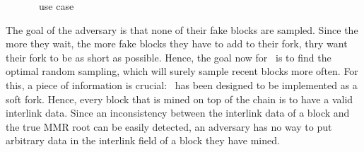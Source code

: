 \documentclass[11pt]{report}
\begin{document}
                    \begin{figure}[ht]
                    \centering
                    \caption{\FC\ use case}
                    \label{figure:fcusecase}
                \end{figure}
                
                    The goal of the adversary is that none of their fake blocks are sampled. Since the more they wait, the more fake blocks they have to add to their fork, thry want their fork to be as short as possible. Hence, the goal now for \FC\ is to find the optimal random sampling, which will surely sample recent blocks more often. For this, a piece of information is crucial: \FC\ has been designed to be implemented as a soft fork. Hence, every block that is mined on top of the chain is to have a valid interlink data. Since an inconsistency between the interlink data of a block and the true MMR root can be easily detected, an adversary has no way to put arbitrary data in the interlink field of a block they have mined.
                    
\end{document}
